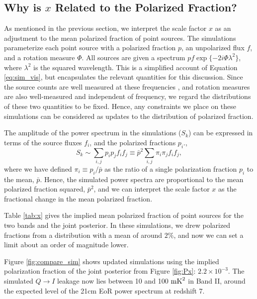 \subsection{Why is $x$ Related to the Polarized Fraction?}

As mentioned in the previous section, we interpret the scale factor $x$ as an adjustment to the mean
polarized fraction of point sources. The simulations parameterize each point source with a polarized
fraction $p$, an unpolarized flux $f$, and a rotation measure $\Phi$. All sources are given a
spectrum $pf\exp\{-2i\Phi\lambda^2\}$, where $\lambda^2$ is the squared wavelength. This is a
simplified account of Equation \ref{eq:sim_vis}, but encapsulates the relevant quantities for this
discussion. Since the source counts are well measured at these frequencies \cite{Hales1988}, and
rotation measures are also well-measured \cite{Oppermann2012} and independent of frequency, we
regard the distributions of these two quantities to be fixed. Hence, any constraints we place on
these simulations can be considered as updates to the distribution of polarized fraction.

The amplitude of the power spectrum in the simulations ($S_k$) can be expressed in terms of the
source fluxes $f_i$, and the polarized fractions $p_i$.,
\begin{equation}
  S_k \sim \sum_{i,j}p_ip_jf_if_j \equiv \bar{p}^2\sum_{i,j}\pi_i\pi_jf_if_j,
\end{equation}
where we have defined $\pi_i \equiv p_i/\bar{p}$ as the ratio of a single polarization fraction
$p_i$ to the mean, $\bar{p}$. Hence, the simulated power spectra are proportional to the mean
polarized fraction squared, $\bar{p}^2$, and we can interpret the scale factor $x$ as the fractional
change in the mean polarized fraction.

Table \ref{tab:x} gives the implied mean polarized fraction of point sources for the two bands and
the joint posterior. In these simulations, we drew polarized fractions from a distribution with a
mean of around $2\%$, and now we can set a limit about an order of magnitude lower. 

Figure \ref{fig:compare_sim} shows updated simulations using the implied polarization fraction of
the joint posterior from Figure \ref{fig:Px}: $2.2\times10^{-3}$. The simulated $Q\to I$ leakage now
lies between 10 and 100 ${\rm mK}^2$ in Band II, around the expected level of the 21cm EoR power
spectrum at redshift 7.

